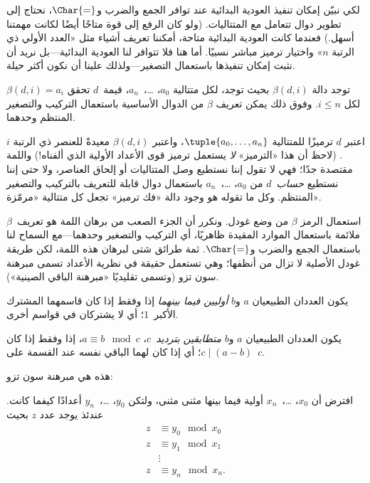 \documentclass[../../../include/open-logic-section]{subfiles}
\begin{document}


لكي نبيّن إمكان تنفيذ العودية البدائية عند توافر الجمع والضرب
و$\Char{=}$، نحتاج إلى تطوير دوال تتعامل مع المتتاليات. (ولو كان
الرفع إلى قوة متاحًا أيضًا لكانت مهمتنا أسهل.) فعندما كانت العودية
البدائية متاحة، أمكننا تعريف أشياء مثل «العدد الأولي ذي الرتبة $n$»
واختيار ترميز مباشر نسبيًا. أما هنا فلا تتوافر لنا العودية
البدائية---بل نريد أن نثبت إمكان تنفيذها باستعمال التصغير---ولذلك
علينا أن نكون أكثر حيلة.

\begin{lem}
توجد دالة $\beta(d,i)$ بحيث توجد، لكل متتالية $a_0$، \dots،~$a_n$،
قيمة~$d$ تحقق $\beta(d,i)=a_i$ لكل $i\le n$. وفوق ذلك يمكن تعريف
$\beta$ من الدوال الأساسية باستعمال التركيب والتصغير المنتظم وحدهما.
\end{lem}

اعتبر $d$ ترميزًا للمتتالية $\tuple{a_0,\dots,a_n}$، واعتبر
$\beta(d,i)$ معيدةً للعنصر ذي الرتبة $i$. (لاحظ أن هذا «الترميز»
\emph{لا} يستعمل ترميز قوى الأعداد الأولية الذي ألفناه!) واللمة
مقتصدة جدًا؛ فهي لا تقول إننا نستطيع وصل المتتاليات أو إلحاق العناصر،
ولا حتى إننا نستطيع \emph{حساب}~$d$ من $a_0$، \dots،~$a_n$ باستعمال
دوال قابلة للتعريف بالتركيب والتصغير المنتظم. وكل ما تقوله هو وجود دالة
«فك ترميز» تجعل كل متتالية «مرمّزة».

استعمال الرمز $\beta$ من وضع غودل. ونكرر أن الجزء الصعب من برهان اللمة
هو تعريف~$\beta$ ملائمة باستعمال الموارد المقيدة ظاهريًا، أي التركيب
والتصغير وحدهما---مع السماح لنا باستعمال الجمع والضرب و$\Char{=}$. ثمة
طرائق شتى لبرهان هذه اللمة، لكن طريقة غودل الأصلية لا تزال من أنظفها؛
وهي تستعمل حقيقة في نظرية الأعداد تسمى مبرهنة سون تزو (وتسمى تقليديًا
«مبرهنة الباقي الصينية»).

\begin{defn}
يكون العددان الطبيعيان $a$ و$b$ \emph{أوليين فيما بينهما} إذا وفقط
إذا كان قاسمهما المشترك الأكبر~$1$؛ أي لا يشتركان في قواسم أخرى.
\end{defn}

\begin{defn}
يكون العددان الطبيعيان $a$ و$b$ \emph{متطابقين بترديد~$c$}،
$a\equiv b\mod c$، إذا وفقط إذا كان $c\mid(a-b)$؛ أي إذا كان لهما
الباقي نفسه عند القسمة على~$c$.
\end{defn}

هذه هي مبرهنة سون تزو:
\begin{thm}
افترض أن $x_0$، \dots،~$x_n$ أولية فيما بينها مثنى مثنى، ولتكن
$y_0$، \dots،~$y_n$ أعدادًا كيفما كانت. عندئذ يوجد عدد $z$ بحيث
\begin{align*}
z & \equiv y_0 \mod x_0 \\
z & \equiv y_1 \mod x_1 \\
& \vdots  \\
z & \equiv y_n \mod x_n.
\end{align*}
\end{thm}
\end{document}
